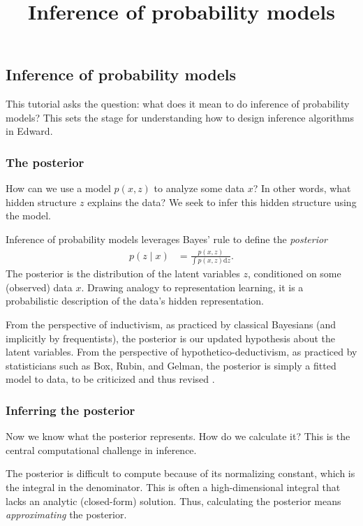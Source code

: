 \title{Inference of probability models}

\subsection{Inference of probability models}

This tutorial asks the question: what does it mean to do inference of
probability models? This sets the stage for understanding how to
design inference algorithms in Edward.

\subsubsection{The posterior}

How can we use a model $p(x,z)$ to analyze some data $x$? In other words,
what hidden structure $z$ explains the data? We seek to infer this
hidden structure using the model.

Inference of probability models leverages Bayes' rule to define the
\emph{posterior}
\begin{align*}
  p(z \mid x)
  &=
  \frac{p(x,z)}{\int p(x,z) \text{d}z}.
\end{align*}
The posterior is the distribution of the latent variables $z$, conditioned on
some (observed) data $x$.
Drawing analogy to representation learning, it is a probabilistic
description of the data's hidden representation.

From the perspective of inductivism, as practiced by classical
Bayesians (and implicitly by frequentists),
the posterior is our updated hypothesis about the latent variables.
From the perspective of hypothetico-deductivism, as practiced by
statisticians such as Box, Rubin, and Gelman, the posterior is simply
a fitted model to data, to be criticized and thus revised
\citep{box1982apology,gelman2013philosophy}.


\subsubsection{Inferring the posterior}

Now we know what the posterior represents. How do we calculate it? This is the
central computational challenge in inference.

The posterior is difficult to compute because of its normalizing
constant, which is the integral in the denominator.
This is often a high-dimensional integral that lacks an analytic (closed-form)
solution. Thus, calculating the posterior means \emph{approximating} the
posterior.

